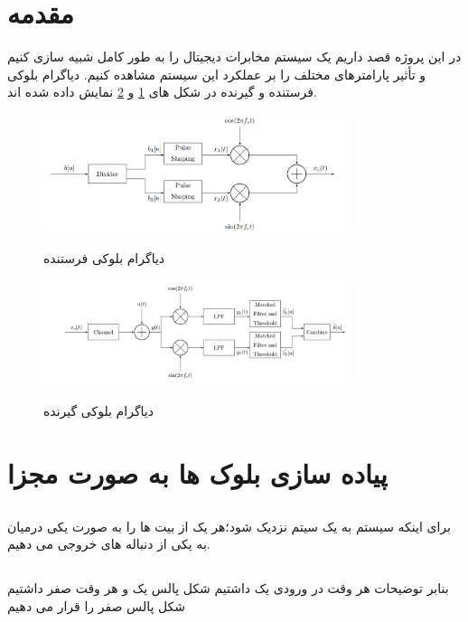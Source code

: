 \documentclass[a4paper]{article}
\begin{document}
	\section{مقدمه}
	در این پروژه قصد داریم یک سیستم مخابرات دیجیتال را به طور کامل شبیه سازی کنیم و تأثیر پارامترهای مختلف را بر عملکرد این سیستم مشاهده کنیم. دیاگرام بلوکی فرستنده و گیرنده در شکل های \ref{fig1} و \ref{fig2} نمایش داده شده اند.
		\begin{figure}[h!]
		
		\includegraphics[width=0.8\textwidth]{comsys_fig01.png}\\ 
		\centering
		\caption{دیاگرام بلوکی فرستنده}
		\label{fig1}
	\end{figure}
	\begin{figure}[h!]
		
		\includegraphics[width=0.8\textwidth]{comsys_fig02.png}\\ 
		\centering
		\caption{دیاگرام بلوکی گیرنده}
		\label{fig2}
	\end{figure}
	\section{پیاده سازی بلوک ها به صورت مجزا}
	\subsection{}
	برای اینکه سیستم به یک سیتم  نزدیک شود؛هر یک از بیت ها را به صورت یکی درمیان به یکی از دنباله های خروجی می دهیم.
	\subsection{}
	بنابر توضیحات هر وقت در ورودی یک داشتیم شکل پالس یک و هر وقت صفر داشتیم شکل پالس صفر را قرار می دهیم
\end{document}
